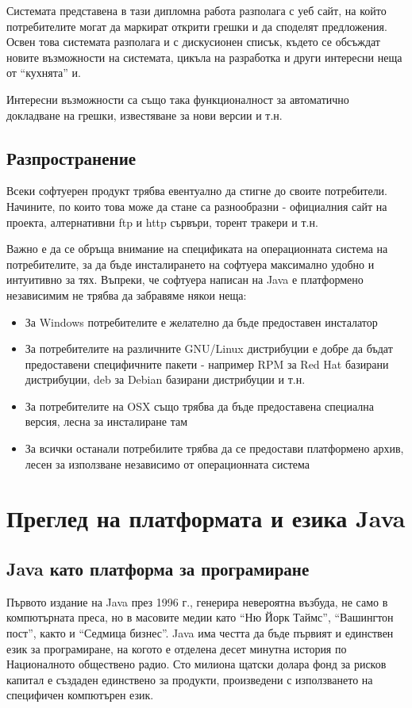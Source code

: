 Системата представена в тази дипломна работа разполага с уеб сайт, на
който потребителите могат да маркират открити грешки и да споделят
предложения. Освен това системата разполага и с дискусионен списък,
където се обсъждат новите възможности на системата, цикъла на
разработка и други интересни неща от "`кухнята"' и. 

Интересни възможности са също така функционалност за автоматично
докладване на грешки, известяване за нови версии и т.н.
\subsection{Разпространение}
Всеки софтуерен продукт трябва евентуално да стигне до своите
потребители. Начините, по които това може да стане са разнообразни -
официалния сайт на проекта, алтернативни ftp и http сървъри, торент
тракери и т.н. 

Важно е да се обръща внимание на спецификата на операционната система
на потребителите, за да бъде инсталирането на софтуера максимално
удобно и интуитивно за тях. Въпреки, че софтуера написан на Java е
платформено независимим не трябва да забравяме някои неща:
\begin{itemize}
  \item За Windows потребителите е желателно да бъде предоставен
  инсталатор
  \item За потребителите на различните GNU/Linux дистрибуции е добре
    да бъдат предоставени специфичните пакети - например RPM за Red
    Hat базирани дистрибуции, deb за Debian базирани дистрибуции и
    т.н.
  \item За потребителите на OSX също трябва да бъде предоставена
    специална версия, лесна за инсталиране там
  \item За всички останали потребилите трябва да се предостави
    платформено архив, лесен за използване независимо от операционната система 
\end{itemize}
\section{Преглед на платформата и езика Java}
\subsection{Java като платформа за програмиране}
Първото издание на Java през 1996 г., генерира невероятна
възбуда, не само в компютърната преса, но в масовите медии като "`Ню
Йорк Таймс"', "`Вашингтон пост"', както и "`Седмица бизнес"'. Java има
честта да бъде  първият и единствен език за програмиране, на когото е
отделена десет минутна история по Националното обществено радио. Сто
милиона щатски долара фонд за рисков капитал е създаден единствено за
продукти, произведени с използването на специфичен компютърен език.

